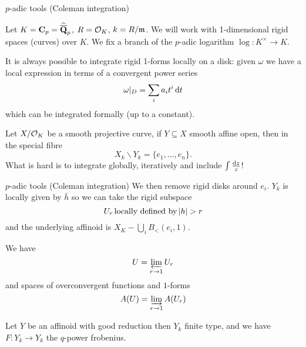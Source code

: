\begin{frame}{\(p\)-adic tools (Coleman integration)}

Let \(K=\mathbf C_p=  \widehat{\overline{\mathbf Q}}_p\), \(R = \mathcal{O}_K\), \(k = R/\mathfrak{m}\). We will work with 1-dimensional rigid spaces (curves) over \(K\).
We fix a branch of the \(p\)-adic logarithm \(\log\colon K^\times \to K\).%
\pause

It is always possible to integrate rigid 1-forms locally on a disk: given \(\omega\) we have a local expression in terms of a convergent power series%
\begin{equation*}
\omega |_{D} =\sum_i a_i t^i \mathop{}\!\mathrm{d} t
\end{equation*}
which can be integrated formally (up to a constant).%
\pause

Let \(X / \mathcal{O} _K\) be a smooth projective curve, if \(Y \subseteq X\) smooth affine open, then in the special fibre%
\begin{equation*}
X_k \smallsetminus Y_k = \{e_1,\ldots, e_n\}\text{.}
\end{equation*}
\pause
What is hard is to integrate globally, iteratively and include \(\int \frac{\mathop{}\!\mathrm{d} z}{z}\)!
\end{frame}

\begin{frame}{\(p\)-adic tools (Coleman integration)}
We then remove rigid disks around \(e_i\). \(Y_k\) is locally given by \(\bar h\) so we can take the rigid subspace%
\begin{equation*}
U_r \text{\,locally defined by\,} |h| > r
\end{equation*}
and the underlying affinoid is \(X_K - \bigcup_{i} B_\lt(e_i,1)\).%
\pause

We have%
\begin{equation*}
U = \varprojlim_{r\to 1} U_r
\end{equation*}
and spaces of overconvergent functions and \(1\)-forms%
\begin{equation*}
A(U) = \varinjlim_{r\to 1} A(U_r)
\end{equation*}


Let \(Y\) be an affinoid with good reduction then \(Y_k\) finite type, and we have \(F\colon Y_k \to  Y_k\) the \(q\)-power frobenius.%
\end{frame}

